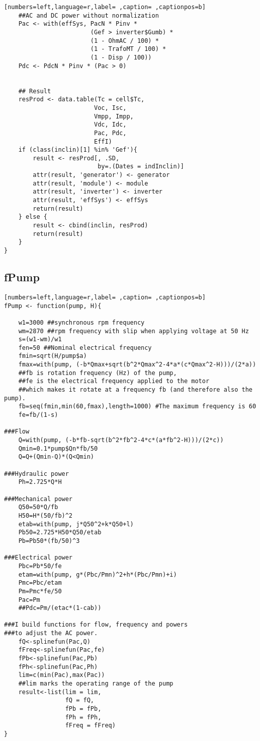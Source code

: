 \begin{lstlisting}[numbers=left,language=r,label= ,caption= ,captionpos=b]
    ##AC and DC power without normalization
    Pac <- with(effSys, PacN * Pinv *
                        (Gef > inverter$Gumb) *
                        (1 - OhmAC / 100) *
                        (1 - TrafoMT / 100) *
                        (1 - Disp / 100))
    Pdc <- PdcN * Pinv * (Pac > 0)


    ## Result
    resProd <- data.table(Tc = cell$Tc,
                         Voc, Isc,
                         Vmpp, Impp,
                         Vdc, Idc,
                         Pac, Pdc,
                         EffI)
    if (class(inclin)[1] %in% 'Gef'){
        result <- resProd[, .SD,
                          by=.(Dates = indInclin)]
        attr(result, 'generator') <- generator
        attr(result, 'module') <- module
        attr(result, 'inverter') <- inverter
        attr(result, 'effSys') <- effSys
        return(result)
    } else {
        result <- cbind(inclin, resProd)
        return(result)
    }
}
\end{lstlisting}
\subsection{fPump}
\label{sec:orgba067ba}
\begin{lstlisting}[numbers=left,language=r,label= ,caption= ,captionpos=b]
fPump <- function(pump, H){

    w1=3000 ##synchronous rpm frequency
    wm=2870 ##rpm frequency with slip when applying voltage at 50 Hz
    s=(w1-wm)/w1
    fen=50 ##Nominal electrical frequency
    fmin=sqrt(H/pump$a)
    fmax=with(pump, (-b*Qmax+sqrt(b^2*Qmax^2-4*a*(c*Qmax^2-H)))/(2*a))
    ##fb is rotation frequency (Hz) of the pump,  
    ##fe is the electrical frequency applied to the motor
    ##which makes it rotate at a frequency fb (and therefore also the pump).
    fb=seq(fmin,min(60,fmax),length=1000) #The maximum frequency is 60
    fe=fb/(1-s)

###Flow
    Q=with(pump, (-b*fb-sqrt(b^2*fb^2-4*c*(a*fb^2-H)))/(2*c))
    Qmin=0.1*pump$Qn*fb/50
    Q=Q+(Qmin-Q)*(Q<Qmin)

###Hydraulic power
    Ph=2.725*Q*H

###Mechanical power
    Q50=50*Q/fb
    H50=H*(50/fb)^2
    etab=with(pump, j*Q50^2+k*Q50+l)
    Pb50=2.725*H50*Q50/etab
    Pb=Pb50*(fb/50)^3

###Electrical power
    Pbc=Pb*50/fe
    etam=with(pump, g*(Pbc/Pmn)^2+h*(Pbc/Pmn)+i)
    Pmc=Pbc/etam
    Pm=Pmc*fe/50
    Pac=Pm
    ##Pdc=Pm/(etac*(1-cab))

###I build functions for flow, frequency and powers
###to adjust the AC power.
    fQ<-splinefun(Pac,Q)
    fFreq<-splinefun(Pac,fe)
    fPb<-splinefun(Pac,Pb)
    fPh<-splinefun(Pac,Ph)
    lim=c(min(Pac),max(Pac))
    ##lim marks the operating range of the pump
    result<-list(lim = lim,
                 fQ = fQ,
                 fPb = fPb,
                 fPh = fPh,
                 fFreq = fFreq)
}
\end{lstlisting}

